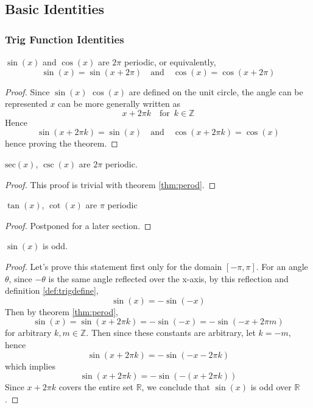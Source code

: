 \documentclass[11pt]{article}
\numberwithin{lemma}{section}
\numberwithin{equation}{section}
\numberwithin{define}{section}
\numberwithin{prop}{section}
\numberwithin{figure}{section}
\numberwithin{theorem}{section}
\numberwithin{cor}{section}
\newcounter{ex}[section]
\numberwithin{ex}{section}
\def\real{\mathbb{R}}
\def\integ{\mathbb{Z}}
\def\jand{\quad\text{and}\quad}
\def\for{\quad\text{for }\,}
\begin{document}
\subsection{Basic Identities}
\subsubsection{Trig Function Identities}
\begin{theorem}
\label{thm:perod}
$\sin(x)$ and $\cos(x)$ are $2\pi$ periodic, or equivalently,
$$\sin(x)=\sin(x+2\pi) \jand \cos(x)=\cos(x+2\pi)$$	
\end{theorem}
\begin{proof}
	Since $\sin(x)$ $\cos(x)$ are defined on the unit circle, the angle can be represented $x$ can be more generally written as
	$$x+2\pi k \for k\in\integ$$
	Hence
	$$\sin(x+2\pi k)=\sin(x) \jand
	\cos(x+2\pi k)=\cos(x)$$
	hence proving the theorem.
\end{proof}

\begin{cor}
	$\text{sec}(x)$, $\csc(x)$ are $2\pi$ periodic.
\end{cor}
\begin{proof}
	This proof is trivial with theorem \eqref{thm:perod}.
\end{proof}

\begin{theorem}
$\tan(x)$, $\cot(x)$ are $\pi$ periodic
\label{thm:tanperodic}
\end{theorem}
\begin{proof}
	Postponed for a later section.
\end{proof}

\begin{theorem}
	$\sin(x)$ is odd.
	\label{thm:sinodd}
\end{theorem}
\begin{proof}
	Let's prove this statement first only for the domain $[-\pi,\pi]$.
	For an angle $\theta$, since $-\theta$ is the same angle reflected over the x-axis, by this reflection and definition \eqref{def:trigdefine},
	$$\sin(x)=-\sin(-x)$$
	Then by theorem \eqref{thm:perod},
	$$\sin(x)=\sin(x+2\pi k)=-\sin(-x)=-\sin(-x+2\pi m)$$
	for arbitrary $k,m\in\integ$. Then since these constants are arbitrary, let $k=-m$, hence
	$$\sin(x+2\pi k)=-\sin(-x-2\pi k)$$
	which implies
	$$\sin(x+2\pi k)=-\sin(-(x+2\pi k))$$
	Since $x+2\pi k$ covers the entire set $\real$, we conclude that $\sin(x)$ is odd over $\real$.
\end{proof}
\end{document}
